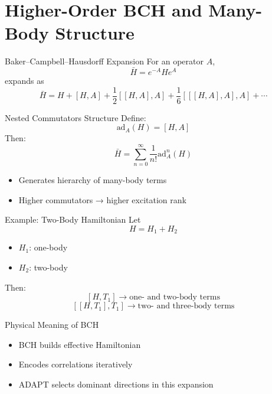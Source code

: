 \documentclass{beamer}
\begin{document}
\section{Higher-Order BCH and Many-Body Structure}

\begin{frame}{Baker--Campbell--Hausdorff Expansion}
For an operator $A$,
\[
\bar{H} = e^{-A} H e^{A}
\]
expands as
\[
\bar{H} = H + [H,A] + \frac{1}{2}[[H,A],A]
+ \frac{1}{6}[[[H,A],A],A] + \cdots
\]
\end{frame}


\begin{frame}{Nested Commutators Structure}
Define:
\[
\text{ad}_A(H) = [H,A]
\]
Then:
\[
\bar{H} = \sum_{n=0}^\infty \frac{1}{n!} \text{ad}_A^n(H)
\]

\begin{itemize}
\item Generates hierarchy of many-body terms
\item Higher commutators → higher excitation rank
\end{itemize}
\end{frame}


\begin{frame}{Example: Two-Body Hamiltonian}
Let
\[
H = H_1 + H_2
\]
\begin{itemize}
\item $H_1$: one-body
\item $H_2$: two-body
\end{itemize}

Then:
\[
[H,T_1] \rightarrow \text{one- and two-body terms}
\]
\[
[[H,T_1],T_1] \rightarrow \text{two- and three-body terms}
\]
\end{frame}


\begin{frame}{Physical Meaning of BCH}
\begin{itemize}
\item BCH builds effective Hamiltonian
\item Encodes correlations iteratively
\item ADAPT selects dominant directions in this expansion
\end{itemize}
\end{frame}
\end{document}
